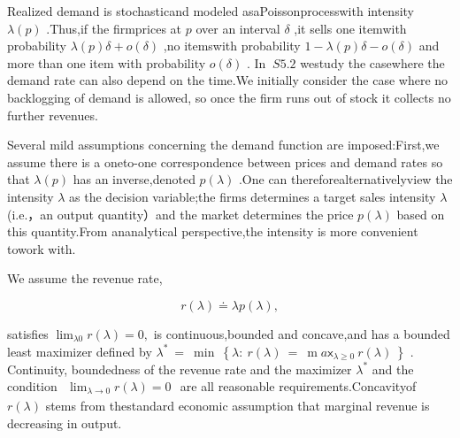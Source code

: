 Realized demand is stochasticand modeled asaPoissonprocesswith intensity
\(\lambda ( p )\) .Thus,if the firmprices at \(p\) over an interval
\(\delta\) ,it sells one itemwith probability
\(\lambda ( p ) \delta + o ( \delta )\) ,no itemswith probability
\(1 - \lambda ( p ) \delta - o ( \delta )\) and more than one item with
probability \(o \left( \delta \right)\) . In \(\ S 5 . 2\) westudy the
casewhere the demand rate can also depend on the time.We initially
consider the case where no backlogging of demand is allowed, so once the
firm runs out of stock it collects no further revenues.

Several mild assumptions concerning the demand function are
imposed:First,we assume there is a oneto-one correspondence between
prices and demand rates so that \(\lambda ( p )\) has an inverse,denoted
\(p ( \lambda )\) .One can thereforealternativelyview the intensity
\(\lambda\) as the decision variable;the firms determines a target sales
intensity \(\lambda\) (i.e.，an output quantity）and the market
determines the price \(p ( \lambda )\) based on this quantity.From
ananalytical perspective,the intensity is more convenient towork with.

We assume the revenue rate,

\[
r ( \lambda ) \doteq \lambda p ( \lambda ) ,
\]

satisfies
\(\operatorname * { l i m } _ { \lambda  0 } r ( \lambda ) = 0 ,\) is
continuous,bounded and concave,and has a bounded least maximizer defined
by
\(\lambda ^ { * } \ = \ \operatorname* { m i n } \ \left\{ \lambda \colon \ r ( \lambda ) \ = \ \operatorname { m } a \mathsf { x } _ { \lambda \geq 0 } \ r ( \lambda ) \ \right\}\)
. Continuity, boundedness of the revenue rate and the maximizer
\(\lambda ^ { * }\) and the condition
\(\begin{array} { r } { \operatorname* { l i m } _ { \lambda \to 0 } r ( \lambda ) = 0 } \end{array}\)
are all reasonable requirements.Concavityof \(r ( \lambda )\) stems from
thestandard economic assumption that marginal revenue is decreasing in
output.

